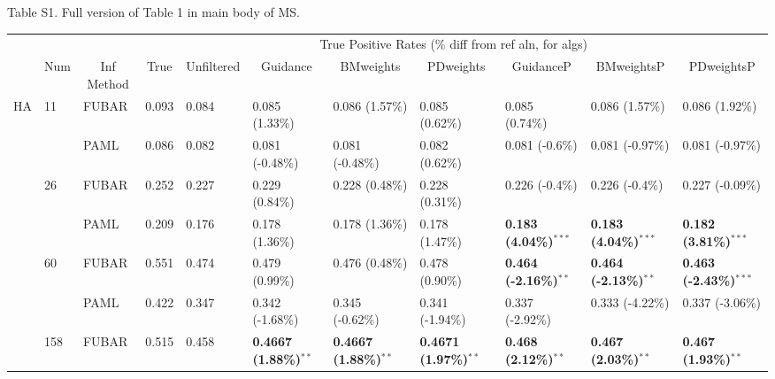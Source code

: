 \documentclass[11pt]{article}
\begin{document}


\noindent Table S1. Full version of Table 1 in main body of MS.
\begin{sidewaystable}[htbp]
\begin{adjustwidth}{-2.25cm}{}
\begin{tabular}{l l l l l l l l l l l}
\hline\noalign{\smallskip}
& & & \multicolumn{8}{c}{True Positive Rates (\% diff from ref aln, for algs)} \\
\cline{4-11}\noalign{\smallskip}
\multicolumn{1}{c}{Profile} & \multicolumn{1}{c}{Num} & \multicolumn{1}{c}{Inf Method} & \multicolumn{1}{c}{True} & \multicolumn{1}{c}{Unfiltered} & \multicolumn{1}{c}{Guidance} & \multicolumn{1}{c}{BMweights} & \multicolumn{1}{c}{PDweights} & \multicolumn{1}{c}{GuidanceP} & \multicolumn{1}{c}{BMweightsP} & \multicolumn{1}{c}{PDweightsP} \\
\noalign{\smallskip}\hline\noalign{\smallskip}
HA  &  11  &  FUBAR  &  0.093  &  0.084  &  0.085 (1.33\%)  &  0.086 (1.57\%)  &  0.085 (0.62\%)  &  0.085 (0.74\%)  &  0.086 (1.57\%)  &  0.086 (1.92\%)  \\
  &    &  PAML       &  0.086  &  0.082  &  0.081 (-0.48\%)  &  0.081 (-0.48\%)  &  0.082 (0.62\%)  &  0.081 (-0.6\%)  &  0.081 (-0.97\%)  &  0.081 (-0.97\%)  \\
\hline
  &  26  &  FUBAR    &  0.252  &  0.227  &  0.229 (0.84\%)  &  0.228 (0.48\%)  &  0.228 (0.31\%)  &  0.226 (-0.4\%)  &  0.226 (-0.4\%)  &  0.227 (-0.09\%)  \\
  &    &  PAML       &  0.209  &  0.176  &  0.178 (1.36\%)  & 0.178 (1.36\%)  &  0.178 (1.47\%)  &  \textbf{0.183 (4.04\%)}$^{\ast\ast\ast}$  &  \textbf{0.183 (4.04\%)}$^{\ast\ast\ast}$  &  \textbf{0.182 (3.81\%)}$^{\ast\ast\ast}$  \\
\hline
  &  60  &  FUBAR    &  0.551  &  0.474  &  0.479 (0.99\%)  &  0.476 (0.48\%)  &  0.478 (0.90\%)  &  \textbf{0.464 (-2.16\%)}$^{\ast\ast}$  &  \textbf{0.464 (-2.13\%)}$^{\ast\ast}$  &  \textbf{0.463 (-2.43\%)}$^{\ast\ast\ast}$  \\
  &    &  PAML       &  0.422  &  0.347  &  0.342 (-1.68\%)  &  0.345 (-0.62\%)  &  0.341 (-1.94\%)  &  0.337 (-2.92\%)  &  0.333 (-4.22\%)  &  0.337 (-3.06\%)  \\
\hline
  &  158  &  FUBAR   &  0.515  &  0.458  & \textbf{0.4667 (1.88\%)}$^{\ast\ast}$  &  \textbf{0.4667 (1.88\%)}$^{\ast\ast}$  &  \textbf{0.4671 (1.97\%)}$^{\ast\ast}$  &  \textbf{0.468 (2.12\%)}$^{\ast\ast}$  &  \textbf{0.467 (2.03\%)}$^{\ast\ast}$  &  \textbf{0.467 (1.93\%)}$^{\ast\ast}$  \\

\end{tabular}
\end{adjustwidth}
\end{sidewaystable}
\end{document}
